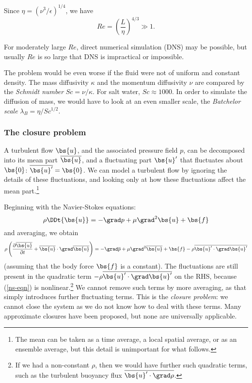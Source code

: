 Since $\eta = (\nu^3/\epsilon)^{1/4}$, we have
\begin{equation}
    Re = \left(\frac{L}{\eta}\right)^{4/3} \gg 1.
\end{equation}

For moderately large $Re$, direct numerical simulation (DNS) may be possible,
but usually $Re$ is so large that DNS is impractical or impossible. 

The problem would be even worse if the fluid were not of uniform and constant
density. The mass diffusivity $\kappa$ and the momentum diffusivity $\nu$ are
compared by the \textit{Schmidt number} $Sc = \nu/\kappa$. For salt water, $Sc
\approx 1000$. In order to simulate the diffusion of mass, we would have to look
at an even smaller scale, the \textit{Batchelor scale}
$\lambda_B=\eta/Sc^{1/2}$. 

\subsubsection{The closure problem}

A turbulent flow $\bs{u}$, and the associated pressure field $p$, can be decomposed into its mean part $\overline{\bs{u}}$, and a fluctuating part $\bs{u}'$ that fluctuates about $\bs{0}$: $\overline{\bs{u}'} = \bs{0}$. We can model a turbulent flow by ignoring the details of these fluctuations, and looking only at how these fluctuations affect the mean part.\footnote{The mean can be taken as a time average, a local spatial average, or as an ensemble average, but this detail is unimportant for what follows.}

Beginning with the Navier-Stokes equations:
\begin{equation}
    \rho\DDt{\bs{u}} = -\grad p + \mu\grad^2\bs{u} + \bs{f}
    \label{ns-eqn}
\end{equation}
and averaging, we obtain
\begin{equation}
    \rho\left(\frac{\partial\overline{\bs{u}}}{\partial t} + \overline{\bs{u}}\cdot\grad\overline{\bs{u}}\right)
    = -\grad\overline{p} + \mu\grad^2\overline{\bs{u}} + \bs{f} - \rho\overline{\bs{u}'\cdot\grad\bs{u}'}
    \label{ave-ns-eqn}
\end{equation}
(assuming that the body force $\bs{f}$ is a constant). The fluctuations are still present in the quadratic term $-\rho\overline{\bs{u}'\cdot\grad\bs{u}'}$ on the RHS, because (\ref{ns-eqn}) is nonlinear.\footnote{If we had a non-constant $\rho$, then we would have further such quadratic terms, such as the turbulent buoyancy flux $\overline{\bs{u}'\cdot\grad\rho}$.} 
We cannot remove such terms by more averaging, as that simply introduces further fluctuating terms. This is the \textit{closure problem}: we cannot close the system as we do not know how to deal with these terms. Many approximate closures have been proposed, but none are universally applicable.

